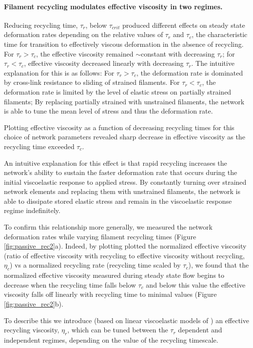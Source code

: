 \documentclass[10pt,letterpaper]{article}
\begin{document}
\paragraph{Filament recycling modulates effective viscosity in two regimes.}
Reducing recycling time, $\tau_r$, below $\tau_{crit}$ produced different effects on steady state deformation rates depending on the relative values of $\tau_r$ and $\tau_c$, the characteristic time for transition to effectively viscous deformation in the absence of recycling. For $\tau_r > \tau_c$, the effective viscosity remained $\sim$constant with decreasing $\tau_r$; for $\tau_r < \tau_c$, effective viscosity decreased linearly with decreasing $\tau_r$.  The intuitive explanation for this is as follows: For $\tau_r > \tau_c$, the deformation rate is dominated by cross-link resistance to sliding of strained filaments. For $\tau_r < \tau_c$, the deformation rate is limited by the level of elastic stress on partially strained filaments; By replacing partially strained with unstrained filaments, the network is able to tune the mean level of stress and thus the deformation rate.

Plotting effective viscosity as a function of decreasing recycling times for this choice of network parameters revealed sharp decrease in effective viscosity as the recycling time exceeded $\tau_c$.  

An intuitive explanation for this effect is that rapid recycling increases the network's ability to sustain the faster deformation rate that occurs during the initial viscoelastic response to applied stress. By constantly turning over strained network elements and replacing them with unstrained filaments, the network is able to dissipate stored elastic stress and remain in the viscoelastic response regime indefinitely.  

To confirm this relationship more generally, we measured the network deformation rates while varying filament recycling times (Figure \ref{fig:passive_rec2}a). Indeed, by plotting plotted the normalized effective viscosity (ratio of effective viscosity with recycling to effective viscosity without recycling, $\eta_c$) vs a normalized recycling rate (recycling time scaled by $\tau_c$), we found that the normalized effective viscosity measured during steady state flow begins to decrease when the recycling time falls below $\tau_c$ and below this value the effective viscosity falls off linearly with recycling time to minimal values (Figure \ref{fig:passive_rec2}b). 

To describe this we introduce (based on linear viscoelastic models of \cite{mccrum1997principles}) an effective recycling viscosity, $\eta_r$, which can be tuned between the $\tau_r$ dependent and independent regimes, depending on the value of the recycling timescale.
\end{document}
